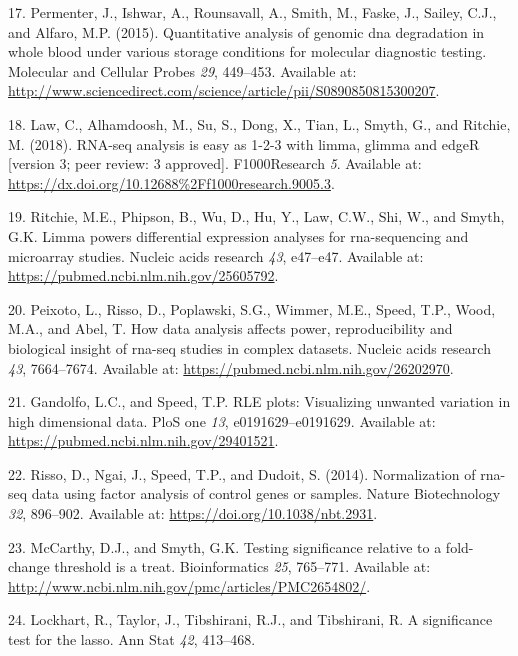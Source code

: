 \documentclass[
]{book}
\newenvironment{cslreferences}%
  {}%
  {\par}
\begin{document}
\begin{cslreferences}
\leavevmode\hypertarget{ref-Permenter:2015aa}{}%
17. Permenter, J., Ishwar, A., Rounsavall, A., Smith, M., Faske, J., Sailey, C.J., and Alfaro, M.P. (2015). Quantitative analysis of genomic dna degradation in whole blood under various storage conditions for molecular diagnostic testing. Molecular and Cellular Probes \emph{29}, 449--453. Available at: \url{http://www.sciencedirect.com/science/article/pii/S0890850815300207}.

\leavevmode\hypertarget{ref-Law:2018aa}{}%
18. Law, C., Alhamdoosh, M., Su, S., Dong, X., Tian, L., Smyth, G., and Ritchie, M. (2018). RNA-seq analysis is easy as 1-2-3 with limma, glimma and edgeR {[}version 3; peer review: 3 approved{]}. F1000Research \emph{5}. Available at: \url{https://dx.doi.org/10.12688\%2Ff1000research.9005.3}.

\leavevmode\hypertarget{ref-Ritchie:2015aa}{}%
19. Ritchie, M.E., Phipson, B., Wu, D., Hu, Y., Law, C.W., Shi, W., and Smyth, G.K. Limma powers differential expression analyses for rna-sequencing and microarray studies. Nucleic acids research \emph{43}, e47--e47. Available at: \url{https://pubmed.ncbi.nlm.nih.gov/25605792}.

\leavevmode\hypertarget{ref-Peixoto:2015aa}{}%
20. Peixoto, L., Risso, D., Poplawski, S.G., Wimmer, M.E., Speed, T.P., Wood, M.A., and Abel, T. How data analysis affects power, reproducibility and biological insight of rna-seq studies in complex datasets. Nucleic acids research \emph{43}, 7664--7674. Available at: \url{https://pubmed.ncbi.nlm.nih.gov/26202970}.

\leavevmode\hypertarget{ref-Gandolfo:2018aa}{}%
21. Gandolfo, L.C., and Speed, T.P. RLE plots: Visualizing unwanted variation in high dimensional data. PloS one \emph{13}, e0191629--e0191629. Available at: \url{https://pubmed.ncbi.nlm.nih.gov/29401521}.

\leavevmode\hypertarget{ref-Risso:2014aa}{}%
22. Risso, D., Ngai, J., Speed, T.P., and Dudoit, S. (2014). Normalization of rna-seq data using factor analysis of control genes or samples. Nature Biotechnology \emph{32}, 896--902. Available at: \url{https://doi.org/10.1038/nbt.2931}.

\leavevmode\hypertarget{ref-McCarthy:2009aa}{}%
23. McCarthy, D.J., and Smyth, G.K. Testing significance relative to a fold-change threshold is a treat. Bioinformatics \emph{25}, 765--771. Available at: \url{http://www.ncbi.nlm.nih.gov/pmc/articles/PMC2654802/}.

\leavevmode\hypertarget{ref-Lockhart:2014aa}{}%
24. Lockhart, R., Taylor, J., Tibshirani, R.J., and Tibshirani, R. A significance test for the lasso. Ann Stat \emph{42}, 413--468.


\end{cslreferences}
\end{document}
